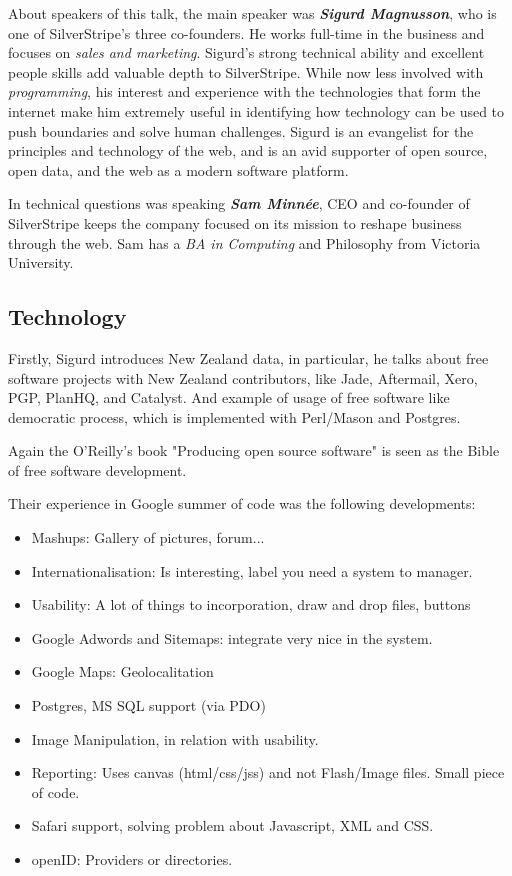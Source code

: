 \documentclass[11pt]{article}
\begin{document}
About speakers of this talk, the main speaker was \emph{\textbf{Sigurd Magnusson}}, who is one of SilverStripe’s three co-founders. He works full-time in the business and focuses on \emph{sales and marketing}.  Sigurd's strong technical ability and excellent people skills add valuable depth to SilverStripe. While now less involved with \emph{programming}, his interest and experience with the technologies that form the internet make him extremely useful in identifying how technology can be used to push boundaries and solve human challenges. Sigurd is an evangelist for the principles and technology of the web, and is an avid supporter of open source, open data, and the web as a modern software platform.

In technical questions was speaking\emph{ \textbf{Sam Minnée}}, CEO and co-founder of SilverStripe keeps the company focused on its mission to reshape business through the web. Sam has a \emph{BA in Computing} and Philosophy from Victoria University.

\subsection{Technology}
Firstly, Sigurd introduces New Zealand data, in particular, he talks about free software projects with New Zealand contributors, like Jade, Aftermail, Xero, PGP, PlanHQ, and Catalyst. And example of usage of free software like democratic process, which is implemented with Perl/Mason and Postgres. 

Again the O'Reilly's book "Producing open source software" is seen as the Bible of free software development.

Their experience in Google summer of code was the following developments:
\begin{itemize}
  \item Mashups: Gallery of pictures, forum...
  \item Internationalisation: Is interesting, label you need a system to manager.
  \item Usability: A lot of things to incorporation, draw and drop files, buttons
  \item Google Adwords and Sitemaps: integrate very nice in the system.
  \item Google Maps: Geolocalitation
  \item Postgres, MS SQL support (via PDO)
  \item Image Manipulation, in relation with usability.
  \item Reporting: Uses canvas (html/css/jss) and not Flash/Image files. Small piece of code.
  \item Safari support, solving problem about Javascript, XML and CSS.
  \item openID: Providers or directories.
\end{itemize}
\end{document}
